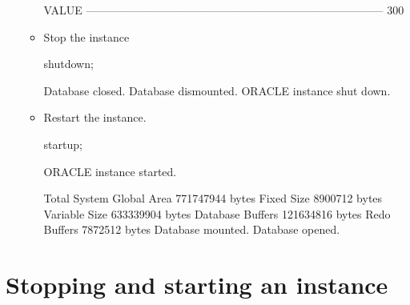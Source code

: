 \documentclass{article}
\begin{document}
\begin{enumerate}
\begin{itemize}
\begin{messageshell}
VALUE
--------------------------------------------------------------------------------
300


\end{messageshell}
\item Stop the instance
\begin{sqlshell}
shutdown;
\end{sqlshell}
\begin{messageshell}
Database closed.
Database dismounted.
ORACLE instance shut down.
\end{messageshell}
\item Restart the instance.
\begin{sqlshell}
startup;
\end{sqlshell}
\begin{messageshell}
ORACLE instance started.

Total System Global Area  771747944 bytes
Fixed Size                  8900712 bytes
Variable Size                633339904 bytes
Database Buffers         121634816 bytes
Redo Buffers                  7872512 bytes
Database mounted.
Database opened.
\end{messageshell}

\end{itemize}

\end{enumerate}

\section{Stopping and starting an instance}
\end{document}
